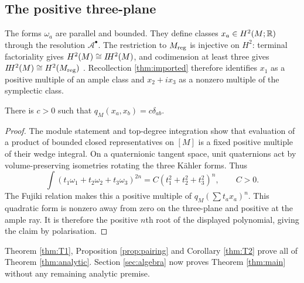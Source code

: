\subsection{The positive three-plane}
The forms $\omega_a$ are parallel and bounded. They define
classes $x_a\in H^2(M;\mathbb R)$ through the resolution
$\mathcal A^\bullet$. The restriction to $M_{\mathrm{reg}}$ is
injective on $H^2$: terminal factoriality gives
$H^2(M)\cong I\!H^2(M)$, and codimension at least three gives
$I\!H^2(M)\cong H^2(M_{\mathrm{reg}})$
\cite[Lemma~2.10, Proposition~2.17]{tighe22}.
Recollection \ref{thm:imported} therefore identifies $x_1$
as a positive multiple of an ample class and $x_2+ix_3$ as
a nonzero multiple of the symplectic class.

\begin{proposition}\label{prop:qF}
There is $c>0$ such that $q_M(x_a,x_b)=c\delta_{ab}$.
\end{proposition}
\begin{proof}
The module statement and top-degree integration show that
evaluation of a product of bounded closed representatives on
$[M]$ is a fixed positive multiple of their wedge integral.
On a quaternionic tangent space, unit quaternions act by
volume-preserving isometries rotating the three K\"ahler
forms. Thus
\[
 \int(t_1\omega_1+t_2\omega_2+t_3\omega_3)^{2n}
 =C(t_1^2+t_2^2+t_3^2)^n,\qquad C>0.
\]
The Fujiki relation \cite[Proposition~5.15]{bl22} makes this
a positive multiple of $q_M(\sum t_ax_a)^n$. This quadratic
form is nonzero away from zero on the three-plane and positive
at the ample ray. It is therefore the positive $n$th root
of the displayed polynomial, giving the claim by polarisation.
\end{proof}

Theorem \ref{thm:T1}, Proposition \ref{prop:pairing} and
Corollary \ref{thm:T2} prove all of Theorem
\ref{thm:analytic}. Section \ref{sec:algebra} now proves
Theorem \ref{thm:main} without any remaining analytic premise.
